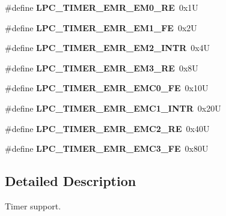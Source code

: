 \begin{DoxyCompactItemize}
\item 
\mbox{\label{group__lpc__timer_ga09c4954e9d70fb35ecf8ca88222094d8}} 
\#define {\bfseries L\+P\+C\+\_\+\+T\+I\+M\+E\+R\+\_\+\+E\+M\+R\+\_\+\+E\+M0\+\_\+\+RE}~0x1U
\item 
\mbox{\label{group__lpc__timer_gad27c40299eb64732aa561bf3e8f33f31}} 
\#define {\bfseries L\+P\+C\+\_\+\+T\+I\+M\+E\+R\+\_\+\+E\+M\+R\+\_\+\+E\+M1\+\_\+\+FE}~0x2U
\item 
\mbox{\label{group__lpc__timer_ga293f9f060dbd164922af70684ae98cc5}} 
\#define {\bfseries L\+P\+C\+\_\+\+T\+I\+M\+E\+R\+\_\+\+E\+M\+R\+\_\+\+E\+M2\+\_\+\+I\+N\+TR}~0x4U
\item 
\mbox{\label{group__lpc__timer_gae083cf89ac8d6b73768bc1d1968ba931}} 
\#define {\bfseries L\+P\+C\+\_\+\+T\+I\+M\+E\+R\+\_\+\+E\+M\+R\+\_\+\+E\+M3\+\_\+\+RE}~0x8U
\item 
\mbox{\label{group__lpc__timer_gac9c0c8521246e9fedb360647e1c45234}} 
\#define {\bfseries L\+P\+C\+\_\+\+T\+I\+M\+E\+R\+\_\+\+E\+M\+R\+\_\+\+E\+M\+C0\+\_\+\+FE}~0x10U
\item 
\mbox{\label{group__lpc__timer_gaff8fe29d81802adbd7376428ac0e63ad}} 
\#define {\bfseries L\+P\+C\+\_\+\+T\+I\+M\+E\+R\+\_\+\+E\+M\+R\+\_\+\+E\+M\+C1\+\_\+\+I\+N\+TR}~0x20U
\item 
\mbox{\label{group__lpc__timer_ga63eb9bfd9d3555100285b0fd5a6cbdd2}} 
\#define {\bfseries L\+P\+C\+\_\+\+T\+I\+M\+E\+R\+\_\+\+E\+M\+R\+\_\+\+E\+M\+C2\+\_\+\+RE}~0x40U
\item 
\mbox{\label{group__lpc__timer_gaee5d491182d6bcb070ebe10b9d31894e}} 
\#define {\bfseries L\+P\+C\+\_\+\+T\+I\+M\+E\+R\+\_\+\+E\+M\+R\+\_\+\+E\+M\+C3\+\_\+\+FE}~0x80U
\end{DoxyCompactItemize}


\subsection{Detailed Description}
Timer support. 

